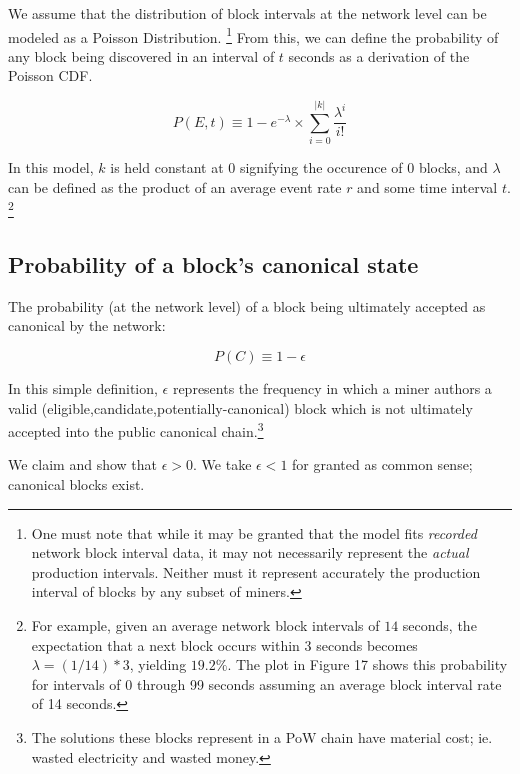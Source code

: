 \documentclass[11pt]{article}
\theoremstyle{plain}
\begin{document}
We assume that the distribution of block intervals at the network level can be
modeled as a Poisson Distribution.\nolinebreak
\footnote{
One must note that while it may be granted that the model fits \emph{recorded}
network block interval data, it may not necessarily represent the \emph{actual}
production intervals. Neither must it represent accurately the production
interval of blocks by any subset of miners.
}
From this, we can define the probability of any block being discovered in an
interval of $t$ seconds as a derivation of the Poisson CDF.

\begin{equation}
P(E,t) \equiv 1 - e^{-\lambda} \times \sum_{i=0}^{|k|}{\frac{\lambda^{i}}{i!}} 
\end{equation}

In this model, $k$ is held constant at $0$ signifying the occurence of 0
blocks, and $\lambda$ can be defined as the product of an average event rate
$r$ and some time interval $t$.\nolinebreak
\footnote{
For example, given an average network block intervals of $14$ seconds, the
expectation that a next block occurs within $3$ seconds becomes $\lambda =
(1/14) * 3$, yielding $19.2\%$.
The plot in Figure 17 shows this probability for intervals of 0 through 99
seconds assuming an average block interval rate of 14 seconds.
}

\subsection{\normalsize{Probability of a block's canonical state}}

The probability (at the network level) of a block being ultimately accepted as
canonical by the network:

\begin{equation}
P(C) \equiv 1 - \epsilon
\end{equation}

In this simple definition, $\epsilon$ represents the frequency in which a miner
authors a valid (eligible,candidate,potentially-canonical) block which is not
ultimately accepted into the public canonical chain.\footnote{The solutions
these blocks represent in a PoW chain have material cost; ie. wasted
electricity and wasted money.}

We claim and show that $\epsilon > 0$. We take $\epsilon < 1$ for granted as
common sense; canonical blocks exist.
\end{document}
